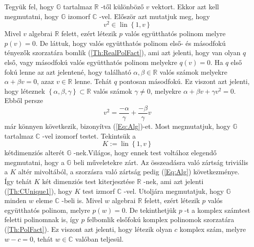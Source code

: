 \documentclass[9pt, showtrims]{memoir}
\makeatletter
\renewenvironment{proof}[1][\proofname]
    {\par\pushQED{\qed}%
    \normalfont \topsep6\p@\@plus6\p@\relax
    \trivlist
    \item[\hskip\labelsep
        \itshape
    #1\@addpunct{:}]\ignorespaces}
    {\popQED\endtrivlist\@endpefalse}
\theoremstyle{plain}
\theoremstyle{remark}
\theoremstyle{definition}
\makeatother
\begin{document}
\begin{proof}
Tegyük fel, hogy $\mathbb{G}$ tartalmaz $\mathbb{R}$ -től különböző $v$ vektort.
Ekkor azt kell megmutatni, hogy $\mathbb{G}$ izomorf $\mathbb{C}$ -vel.\newline
Először azt mutatjuk meg, hogy 
\begin{equation}
v^{2}\in \operatorname{lin}\left\{ 1,v\right\} 
\end{equation}
\label{Eq:Alg}Mivel $v$ algebrai $\mathbb{R}$ felett, ezért létezik $p$
valós együtthatós polinom melyre $p\left( v\right) =0$.
De láttuk, hogy valós együtthatós polinom első- és másodfokú tényezők szorzatára bomlik (\ref{Th:RealPolFact}),
ami azt jelenti, hogy van olyan $q$ első, vagy másodfokú valós együtthatós polinom melyekre $q\left( v\right) =0$.
Ha $q$ első
fokú lenne az azt jelentené, hogy található $\alpha ,\beta
\in \mathbb{R}$ valós számok melyekre $\alpha +\beta v=0$, azaz $v\in \mathbb{R}$ lenne.
Tehát $q$ pontosan másodfokú.
Ez viszont azt
jelenti, hogy léteznek $\left\{ \alpha ,\beta ,\gamma \right\} \subset 
\mathbb{R}$ valós számok $\gamma \neq 0$, melyekre $\alpha +\beta
v+\gamma v^{2}=0$.
Ebből persze 
\[
v^{2}=\frac{-\alpha }{\gamma }+\frac{-\beta }{\gamma }v
\]
már könnyen következik, bizonyítva (\ref{Eq:Alg})-et.\newline
Most megmutatjuk, hogy $\mathbb{G}$ tartalmaz $\mathbb{C}$ -vel izomorf testet.
Tekintsük a 
\[
K:=\operatorname{lin}\left\{ 1,v\right\} 
\]
kétdimenziós alterét $\mathbb{G}$ -nek.Világos, hogy ennek test
voltához elegendő megmutatni, hogy a $\mathbb{G}$ beli műveletekre zárt.
Az összeadásra való zártság triviális a $K$
altér mivoltából, a szorzásra való zártság pedig
(\ref{Eq:Alg}) következménye.
\'{I}gy tehát $K$ két dimenziós test kiterjesztése $\mathbb{R}$ -nek, ami azt jelenti (\ref{Th:CUnique1}), 
hogy $K$ test izmorf $\mathbb{C}$ -vel.\newline
Utoljára megmutatjuk, hogy $\mathbb{G}$ minden $w$ eleme $\mathbb{C}$ -beli
is.
Mivel $w$ algebrai $\mathbb{R}$ felett, ezért létezik $p$ valós együtthatós polinom, melyre $p\left( w\right) =0$.
De tekinthetjük $p$ -t a komplex számtest feletti polinomnak is, így $p$
felbomlik elsőfokú komplex polinomok szorzatára (\ref{Th:PolFact}).
Ez viszont azt jelenti, hogy létezik olyan $c$ komplex szám,
melyre $w-c=0$, tehát $w\in \mathbb{C}$ valóban teljesül.
\end{proof}

\backmatter
\pagestyle{empty}

\printindex
\end{document}
